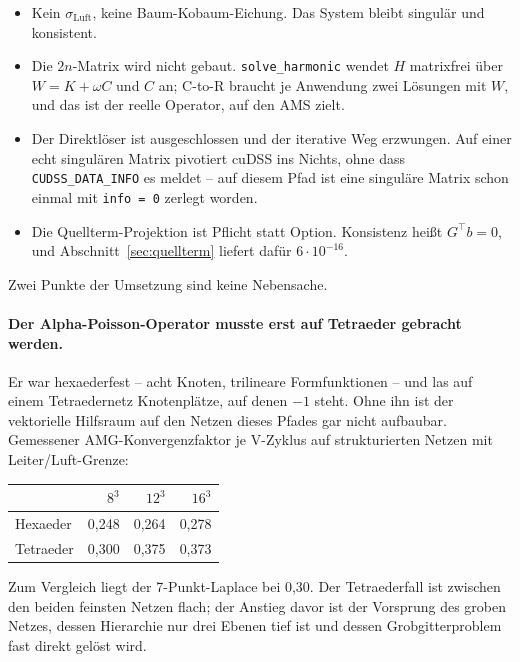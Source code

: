 \documentclass[11pt,a4paper]{article}
\begin{document}
\begin{itemize}[nosep]
\item Kein $\sigma_{\text{Luft}}$, keine Baum-Kobaum-Eichung. Das System bleibt
  singulär und konsistent.
\item Die $2n$-Matrix wird nicht gebaut. \texttt{solve\_harmonic} wendet $H$
  matrixfrei über $W = K + \omega C$ und $C$ an; C-to-R braucht je Anwendung
  zwei Lösungen mit $W$, und das ist der reelle Operator, auf den AMS zielt.
\item Der Direktlöser ist ausgeschlossen und der iterative Weg erzwungen. Auf
  einer echt singulären Matrix pivotiert cuDSS ins Nichts, ohne dass
  \texttt{CUDSS\_DATA\_INFO} es meldet -- auf diesem Pfad ist eine singuläre
  Matrix schon einmal mit \texttt{info = 0} zerlegt worden.
\item Die Quellterm-Projektion ist Pflicht statt Option. Konsistenz heißt
  $G^{\!\top}b = 0$, und Abschnitt~\ref{sec:quellterm} liefert dafür
  $6\cdot10^{-16}$.
\end{itemize}

Zwei Punkte der Umsetzung sind keine Nebensache.

\paragraph{Der Alpha-Poisson-Operator musste erst auf Tetraeder gebracht
werden.} Er war hexaederfest -- acht Knoten, trilineare Formfunktionen -- und
las auf einem Tetraedernetz Knotenplätze, auf denen $-1$ steht. Ohne ihn ist
der vektorielle Hilfsraum auf den Netzen dieses Pfades gar nicht aufbaubar.
Gemessener AMG-Konvergenzfaktor je V-Zyklus auf strukturierten Netzen mit
Leiter/Luft-Grenze:

\begin{center}
\begin{tabular}{lrrr}
\toprule
 & $8^3$ & $12^3$ & $16^3$ \\
\midrule
Hexaeder  & 0,248 & 0,264 & 0,278 \\
Tetraeder & 0,300 & 0,375 & 0,373 \\
\bottomrule
\end{tabular}
\end{center}

Zum Vergleich liegt der 7-Punkt-Laplace bei 0,30. Der Tetraederfall ist
zwischen den beiden feinsten Netzen flach; der Anstieg davor ist der Vorsprung
des groben Netzes, dessen Hierarchie nur drei Ebenen tief ist und dessen
Grobgitterproblem fast direkt gelöst wird.
\end{document}
